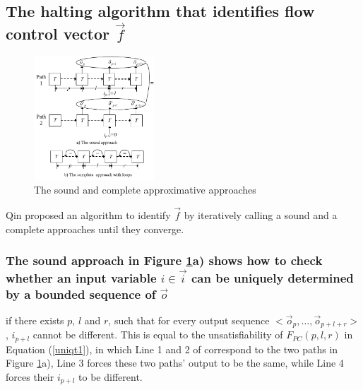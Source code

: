 \documentclass[conference]{IEEEtran}
\begin{document}
\subsection{The halting algorithm that identifies flow control vector $\vec{f}$}\label{subsec_chkextdec}

\begin{figure}[t]
\begin{center}
\includegraphics[width=0.4\textwidth]{pc}
\end{center}
\caption{The sound and complete approximative approaches}
  \label{fig_pc}
\end{figure}

Qin \cite{QinTODAES15} proposed an algorithm
to identify $\vec{f}$ by iteratively calling 
a sound and a complete approaches until they converge.

\subsubsection{The sound approach in Figure \ref{fig_pc}a) shows how to check whether
an input variable $i\in\vec{i}$ can be uniquely determined by a bounded sequence of $\vec{o}$}\label{subsub_sound}
if there exists $p$, $l$ and $r$,
such that for every output sequence $<\vec{o}_p,\dots,\vec{o}_{p+l+r}>$,
$i_{p+l}$ cannot be different.
This is equal to the unsatisfiability of $F_{PC}(p,l,r)$ in Equation (\ref{uniqt1}),
in which Line 1 and 2 of correspond to the two paths in Figure \ref{fig_pc}a),
Line 3 forces these two paths' output to be the same,
while Line 4 forces their $i_{p+l}$ to be different.
\end{document}
